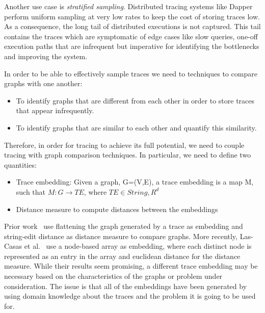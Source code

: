 Another use case is \emph{stratified sampling}. Distributed tracing systems like Dapper~\cite{36356} perform uniform sampling at very low rates to keep the cost of storing traces low.  As a consequence, the long tail of distributed executions is not captured. This tail contains the traces which are symptomatic of edge cases like slow queries, one-off execution paths that are infrequent but imperative for identifying the bottlenecks and improving the system. 

In order to be able to effectively sample traces we need to techniques to compare graphs with one another:
\begin{itemize}
\item To identify graphs that are different from each other in order to store traces that appear infrequently.
\item To identify graphs that are similar to each other and quantify this similarity. 
\end{itemize}

Therefore, in order for tracing to achieve its full potential, we need to couple tracing with graph comparison techniques. In particular, we need to define two quantities:
\begin{itemize}
\item Trace embedding: \newline
Given a graph, G=(V,E), a trace embedding is a map M, such that \newline
$M\colon G \rightarrow TE$, where $TE \in String, R^{d}$
\item Distance measure to compute distances between the embeddings
\end{itemize}
Prior work~\cite{Barham:2003:MOM:1251054.1251069, Sambasivan:2011:DPC:1972457.1972463} use flattening the graph generated by a trace as embedding and string-edit distance as distance measure to compare graphs. More recently, Las-Casas et al.~\cite{Las-Casas:2018:WSE:3267809.3267841} use a node-based array as embedding, where each distinct node is represented as an entry in the array and euclidean distance for the distance measure. While their results seem promising, a different trace embedding may be necessary based on the characteristics of the graphs or problem under consideration. The issue is that all of the embeddings have been generated by using domain knowledge about the traces and the problem it is going to be used for. 

